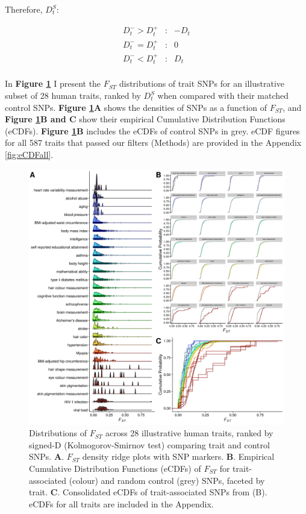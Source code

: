 \documentclass[
]{book}
\begin{document}
Therefore, \({D_t^S}\):

\[
\begin{aligned}
D_t^- > D_t^+ &: &-D_t \\
D_t^- = D_t^+ &: &0 \\
D_t^- < D_t^+ &: &D_t \\
\end{aligned}
\]

In \textbf{Figure \ref{fig:FstMain}} I present the \(F_{ST}\) distributions of trait SNPs for an illustrative subset of 28 human traits, ranked by \({D_t^S}\) when compared with their matched control SNPs. \textbf{Figure \ref{fig:FstMain}A} shows the densities of SNPs as a function of \(F_{ST}\), and \textbf{Figure \ref{fig:FstMain}B and C} show their empirical Cumulative Distribution Functions (eCDFs). \textbf{Figure \ref{fig:FstMain}B} includes the eCDFs of control SNPs in grey. eCDF figures for all 587 traits that passed our filters (Methods) are provided in the Appendix \ref{fig:eCDFall}.



\begin{figure}
\includegraphics[width=1\linewidth]{figs/fst/0.1_1000_20220314_final} \caption{Distributions of \(F_{ST}\) across 28 illustrative human traits, ranked by signed-D (Kolmogorov-Smirnov test) comparing trait and control SNPs. \textbf{A}. \(F_{ST}\) density ridge plots with SNP markers. \textbf{B}. Empirical Cumulative Distribution Functions (eCDFs) of \(F_{ST}\) for trait-associated (colour) and random control (grey) SNPs, faceted by trait. \textbf{C}. Consolidated eCDFs of trait-associated SNPs from (B). eCDFs for all traits are included in the Appendix.}\label{fig:FstMain}
\end{figure}
\end{document}
